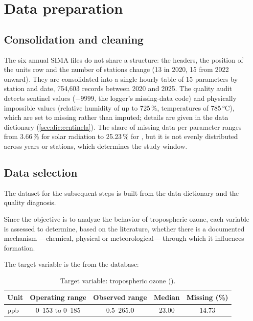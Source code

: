 \section{Data preparation}
\label{sec:preparacion-datos}

\subsection{Consolidation and cleaning}

The six annual SIMA files do not share a structure: the headers, the
position of the units row and the number of stations change (13 in 2020,
15 from 2022 onward). They are consolidated into a single hourly table of
15 parameters by station and date, 754,603 records between 2020 and 2025.
The quality audit detects sentinel values ($-9999$, the logger's missing-data
code) and physically impossible values (relative humidity of up to
725\,\%, temperatures of 785\,°C), which are set to missing rather than
imputed; details are given in the data dictionary (\cref{sec:dic:centinela}).
The share of missing data per parameter ranges from 3.66\,\% for solar
radiation to 25.23\,\% for , but it is not evenly distributed
across years or stations, which determines the study window.

\subsection{Data selection}

The dataset for the subsequent steps is built from the data dictionary and
the quality diagnosis.

Since the objective is to analyze the behavior of tropospheric ozone, each
variable is assessed to determine, based on the literature, whether there is
a documented mechanism ---chemical, physical or meteorological--- through
which it influences  formation.

The target variable is the  from the database:

\begin{table}[pos=t]
  \centering
  \caption{Target variable: tropospheric ozone ().}
  \label{tab:variable-objetivo}
  \begin{tabular}{lcccc}
    \toprule
    Unit & Operating range & Observed range & Median & Missing (\%) \\
    \midrule
    ppb & 0--153 to 0--185 & 0.5--265.0 & 23.00 & 14.73 \\
    \bottomrule
  \end{tabular}
\end{table}

